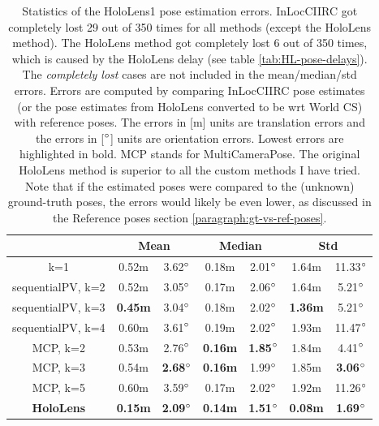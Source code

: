\documentclass[twoside]{ctuthesis}
\theoremstyle{plain}
\theoremstyle{definition}
\theoremstyle{note}
\begin{document}
\begin{table}[htb!]
	\centering
	\begin{tabular}{|c|c|c|c|c|c|c|}
		\hline
		\diagbox{\small Method}{\small Statistics} & \multicolumn{2}{c|}{Mean} & \multicolumn{2}{c|}{Median} & \multicolumn{2}{c|}{Std} \\
		\hline
		k=1 & 0.52m & 3.62$\degree$ & 0.18m & 2.01$\degree$ & 1.64m & 11.33$\degree$ \\
		\hline
		sequentialPV, k=2 & 0.52m & 3.05$\degree$ & 0.17m & 2.06$\degree$ & 1.64m & 5.21$\degree$ \\
		\hline
		sequentialPV, k=3 & \bfseries 0.45m & 3.04$\degree$ & 0.18m & 2.02$\degree$ & \bfseries 1.36m & 5.21$\degree$ \\
		\hline
		sequentialPV, k=4 & 0.60m & 3.61$\degree$ & 0.19m & 2.02$\degree$ & 1.93m & 11.47$\degree$ \\
		\hline
		MCP, k=2 & 0.53m & 2.76$\degree$ & \bfseries 0.16m & \bfseries 1.85$\degree$ & 1.84m & 4.41$\degree$ \\
		\hline
		MCP, k=3 & 0.54m & \bfseries 2.68$\degree$ & \bfseries 0.16m & 1.99$\degree$ & 1.85m & \bfseries 3.06$\degree$ \\
		\hline
		MCP, k=5 & 0.60m & 3.59$\degree$ & 0.17m & 2.02$\degree$ & 1.92m & 11.26$\degree$ \\
		\hline
		\bfseries HoloLens & \bfseries 0.15m & \bfseries 2.09$\degree$ & \bfseries 0.14m & \bfseries 1.51$\degree$ & \bfseries 0.08m & \bfseries 1.69$\degree$ \\
		\hline
	\end{tabular}
	\caption{Statistics of the HoloLens1 pose estimation errors. InLocCIIRC got completely lost 29 out of 350 times for all methods (except the HoloLens method). The HoloLens method got completely lost 6 out of 350 times, which is caused by the HoloLens delay (see table \ref{tab:HL-pose-delays}). The \emph{completely lost} cases are not included in the mean/median/std errors. Errors are computed by comparing InLocCIIRC pose estimates (or the pose estimates from HoloLens converted to be wrt World CS) with reference poses. The errors in [m] units are translation errors and the errors in [$\degree$] units are orientation errors. Lowest errors are highlighted in bold. MCP stands for MultiCameraPose. The original HoloLens method is superior to all the custom methods I have tried. Note that if the estimated poses were compared to the (unknown) ground-truth poses, the errors would likely be even lower, as discussed in the Reference poses section \ref{paragraph:gt-vs-ref-poses}.}
	\label{tab:HL1-other-statistics}
\end{table}
\end{document}

